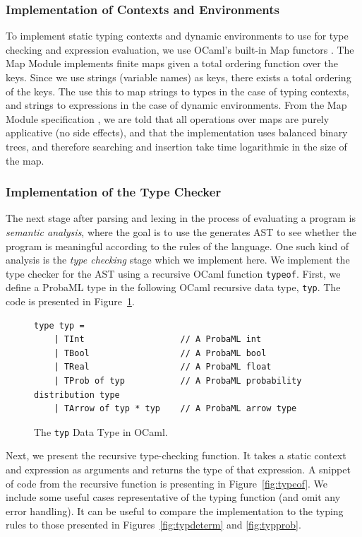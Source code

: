 \documentclass[pageno]{jpaper}
\begin{document}
\subsubsection{Implementation of Contexts and Environments}
To implement static typing contexts and dynamic environments to use for type checking and expression evaluation, we use OCaml's built-in Map functors \cite{ocaml_map}. The Map Module implements finite maps given a total ordering function over the keys. Since we use strings (variable names) as keys, there exists a total ordering of the keys. The use this to map strings to types in the case of typing contexts, and strings to expressions in the case of dynamic environments. From the Map Module specification \cite{ocaml_map}, we are told that all operations over maps are purely applicative (no side effects), and that the implementation uses balanced binary trees, and therefore searching and insertion take time logarithmic in the size of the map.

\subsubsection{Implementation of the Type Checker}
The next stage after parsing and lexing in the process of evaluating a program is \emph{semantic analysis}, where the goal is to use the generates AST to see whether the program is meaningful according to the rules of the language. One such kind of analysis is the \emph{type checking} stage which we implement here. We implement the type checker for the AST using a recursive OCaml function \texttt{typeof}. First, we define a ProbaML type in the following OCaml recursive data type, \texttt{typ}. The code is presented in Figure~\ref{fig:types}.

\begin{figure}[hbt]
  \begin{Verbatim}[frame=single, baselinestretch=1, formatcom=\color{MidnightBlue}]
    type typ =
    | TInt                   // A ProbaML int
    | TBool                  // A ProbaML bool
    | TReal                  // A ProbaML float
    | TProb of typ           // A ProbaML probability distribution type
    | TArrow of typ * typ    // A ProbaML arrow type
  \end{Verbatim}
  \caption{The \texttt{typ} Data Type in OCaml.}
  \label{fig:types}
\end{figure}

Next, we present the recursive type-checking function. It takes a static context and expression as arguments and returns the type of that expression. A snippet of code from the recursive function is presenting in Figure~\ref{fig:typeof}. We include some useful cases representative of the typing function (and omit any error handling). It can be useful to compare the implementation to the typing rules to those presented in Figures~\ref{fig:typdeterm} and \ref{fig:typprob}.
\end{document}
